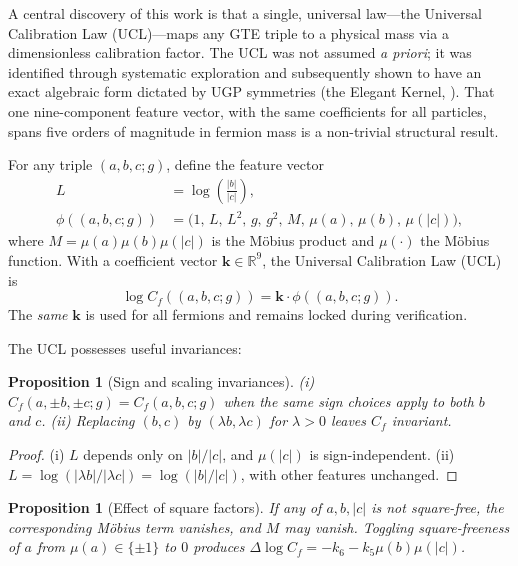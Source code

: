 \documentclass[11pt]{article}
\newtheorem{proposition}[theorem]{Proposition}
\theoremstyle{remark}
\newcommand{\R}{\mathbb{R}}
\newcommand{\mob}{\mu}
\newcommand{\Cf}{C_{\!f}}
\newcommand{\triple}{(a,b,c;g)}
\begin{document}
A central discovery of this work is that a single, universal law---the Universal Calibration Law (UCL)---maps any GTE triple to a physical mass via a dimensionless calibration factor.
The UCL was not assumed \emph{a priori}; it was identified through systematic exploration and subsequently shown to have an exact algebraic form dictated by UGP symmetries (the Elegant Kernel, ).
That one nine-component feature vector, with the same coefficients for all particles, spans five orders of magnitude in fermion mass is a non-trivial structural result.

For any triple $\triple$, define the feature vector
\[
\begin{aligned}
L &= \log\!\left(\frac{|b|}{|c|}\right), \\
\phi(\triple) &= \big(1,\, L,\, L^2,\, g,\, g^2,\, M,\, \mob(a),\, \mob(b),\, \mob(|c|)\big),
\end{aligned}
\]
where $M = \mob(a)\mob(b)\mob(|c|)$ is the M\"obius product and $\mob(\cdot)$ the M\"obius function.
With a coefficient vector $\mathbf{k} \in \R^9$, the Universal Calibration Law (UCL) is
\begin{equation}
\log \Cf(\triple) = \mathbf{k} \cdot \phi(\triple).
\label{eq:ucl}
\end{equation}
The \emph{same} $\mathbf{k}$ is used for all fermions and remains locked during verification.

The UCL possesses useful invariances:

\begin{proposition}[Sign and scaling invariances]
\label{prop:invariance}
(i) $\Cf(a, \pm b, \pm c; g) = \Cf(a, b, c; g)$ when the same sign choices apply to both $b$ and $c$.
(ii) Replacing $(b, c)$ by $(\lambda b, \lambda c)$ for $\lambda > 0$ leaves $\Cf$ invariant.
\end{proposition}

\begin{proof}
(i) $L$ depends only on $|b|/|c|$, and $\mob(|c|)$ is sign-independent.
(ii) $L = \log(|\lambda b|/|\lambda c|) = \log(|b|/|c|)$, with other features unchanged.
\end{proof}

\begin{proposition}[Effect of square factors]
\label{prop:square}
If any of $a, b, |c|$ is not square-free, the corresponding M\"obius term vanishes, and $M$ may vanish.
Toggling square-freeness of $a$ from $\mob(a) \in \{\pm 1\}$ to $0$ produces $\Delta \log \Cf = -k_6 - k_5 \mob(b)\mob(|c|)$.
\end{proposition}
\end{document}
